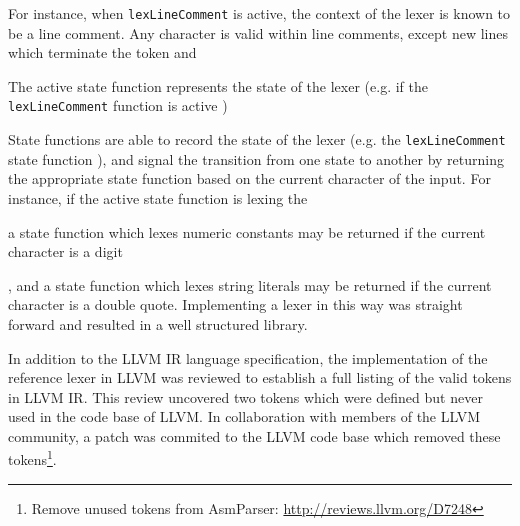 For instance, when \texttt{lexLineComment} is active, the context of the lexer is known to be a line comment. Any character is valid within line comments, except new lines which terminate the token and

The active state function represents the state of the lexer (e.g. if the \texttt{lexLineComment} function is active )

State functions are able to record the state of the lexer (e.g. the \texttt{lexLineComment} state function ), and signal the transition from one state to another by returning the appropriate state function based on the current character of the input. For instance, if the active state function is lexing the

a state function which lexes numeric constants may be returned if the current character is a digit

, and a state function which lexes string literals may be returned if the current character is a double quote. Implementing a lexer in this way was straight forward and resulted in a well structured library.

In addition to the LLVM IR language specification, the implementation of the reference lexer in LLVM was reviewed to establish a full listing of the valid tokens in LLVM IR. This review uncovered two tokens which were defined but never used in the code base of LLVM. In collaboration with members of the LLVM community, a patch was commited to the LLVM code base which removed these tokens\footnote{Remove unused tokens from AsmParser: \url{http://reviews.llvm.org/D7248}}.



%


%

%


